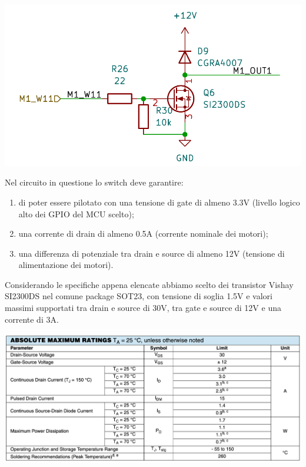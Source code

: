 \begin{center}
\includegraphics[scale=0.5]{figures/image63.png}
\captionsetup{type=figure}
\end{center}

\noindent Nel circuito in questione lo switch deve garantire:

\begin{enumerate}
\def\labelenumi{\arabic{enumi}.}
\item
  
  di poter essere pilotato con una tensione di gate di almeno 3.3V
  (livello logico alto dei GPIO del MCU scelto);
  
\item
  
  una corrente di drain di almeno 0.5A (corrente nominale dei motori);
  
\item
  
  una differenza di potenziale tra drain e source di almeno 12V
  (tensione di alimentazione dei motori).
  
\end{enumerate}

\noindent Considerando le specifiche appena elencate abbiamo scelto dei transistor
Vishay SI2300DS nel comune package SOT23, con tensione di soglia 1.5V e
valori massimi supportati tra drain e source di 30V, tra gate e source
di 12V e una corrente di 3A.

\begin{center}
\includegraphics[scale=0.5]{figures/image69.png}
\captionsetup{type=figure}
\end{center}

